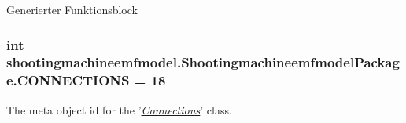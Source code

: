 Generierter Funktionsblock  \hypertarget{interfaceshootingmachineemfmodel_1_1_shootingmachineemfmodel_package_a8a76dc627f9336bbd84e2f73057f5f54}{
\subsubsection[{C\-O\-N\-N\-E\-C\-T\-I\-O\-N\-S}]{\setlength{\rightskip}{0pt plus 5cm}int shootingmachineemfmodel.\-Shootingmachineemfmodel\-Package.\-C\-O\-N\-N\-E\-C\-T\-I\-O\-N\-S = 18}}\label{interfaceshootingmachineemfmodel_1_1_shootingmachineemfmodel_package_a8a76dc627f9336bbd84e2f73057f5f54}
The meta object id for the '\hyperlink{classshootingmachineemfmodel_1_1impl_1_1_connections_impl}{{\itshape Connections}}' class.


